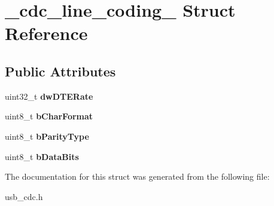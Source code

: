 \hypertarget{struct__cdc__line__coding__}{\section{\-\_\-cdc\-\_\-line\-\_\-coding\-\_\- Struct Reference}
\label{struct__cdc__line__coding__}
}
\subsection*{Public Attributes}
\begin{DoxyCompactItemize}
\item 
\hypertarget{struct__cdc__line__coding___af5653e0a5c72e957e563c9fa04e7190c}{uint32\-\_\-t {\bfseries dw\-D\-T\-E\-Rate}}\label{struct__cdc__line__coding___af5653e0a5c72e957e563c9fa04e7190c}

\item 
\hypertarget{struct__cdc__line__coding___a381a7e4871c57edc4ea9fec514fb25ab}{uint8\-\_\-t {\bfseries b\-Char\-Format}}\label{struct__cdc__line__coding___a381a7e4871c57edc4ea9fec514fb25ab}

\item 
\hypertarget{struct__cdc__line__coding___a8f41fe2fe3782ce98f2547dcf11e3eb6}{uint8\-\_\-t {\bfseries b\-Parity\-Type}}\label{struct__cdc__line__coding___a8f41fe2fe3782ce98f2547dcf11e3eb6}

\item 
\hypertarget{struct__cdc__line__coding___a46de2797242a70a9df4f7a09a4571bbe}{uint8\-\_\-t {\bfseries b\-Data\-Bits}}\label{struct__cdc__line__coding___a46de2797242a70a9df4f7a09a4571bbe}

\end{DoxyCompactItemize}


The documentation for this struct was generated from the following file\-:\begin{DoxyCompactItemize}
\item 
usb\-\_\-cdc.\-h\end{DoxyCompactItemize}
